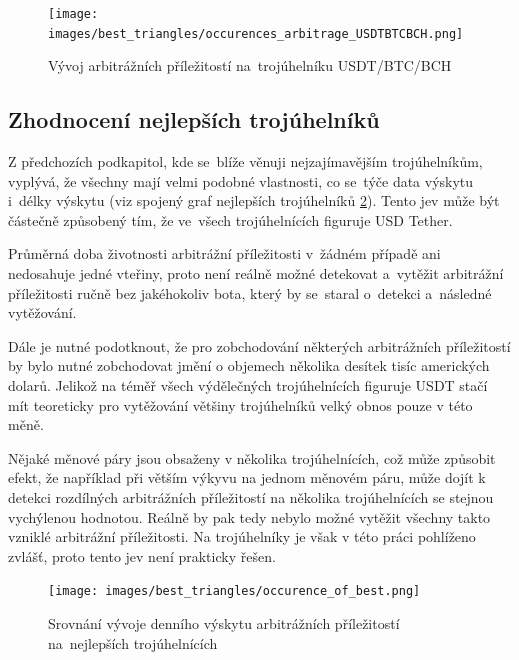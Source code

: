 \documentclass[thesis=B,czech]{FITthesis}[2019/03/21]
\begin{document}
\begin{figure}\centering
	\texttt{[image: images/best\_triangles/occurences\_arbitrage\_USDTBTCBCH.png]}
	\caption{Vývoj arbitrážních příležitostí na~trojúhelníku USDT/BTC/BCH }\label{occurences_arbitrage_USDTBTCBCH}
\end{figure}

\newpage

\subsection{Zhodnocení nejlepších trojúhelníků}
Z předchozích podkapitol, kde se~blíže věnuji nejzajímavějším trojúhelníkům, vyplývá, že všechny mají velmi podobné vlastnosti, co se~týče data výskytu i~délky výskytu (viz spojený graf nejlepších trojúhelníků \ref{occurence_of_best}). Tento jev může být částečně způsobený tím, že ve~všech trojúhelnících figuruje USD Tether. 

Průměrná doba životnosti arbitrážní příležitosti v~žádném případě ani nedosahuje jedné vteřiny, proto není reálně možné detekovat a~vytěžit arbitrážní příležitosti ručně bez jakéhokoliv bota, který by se~staral o~detekci a~následné vytěžování. 

Dále je nutné podotknout, že pro zobchodování některých arbitrážních příležitostí by bylo nutné zobchodovat jmění o objemech několika desítek tisíc amerických dolarů. Jelikož na téměř všech výdělečných trojúhelnících figuruje USDT stačí mít teoreticky pro vytěžování většiny trojúhelníků velký obnos pouze v této měně.

Nějaké měnové páry jsou obsaženy v několika trojúhelnících, což může způsobit efekt, že například při větším výkyvu na jednom měnovém páru, může dojít k detekci rozdílných arbitrážních příležitostí na několika trojúhelnících se stejnou vychýlenou hodnotou. Reálně by pak tedy nebylo možné vytěžit všechny takto vzniklé arbitrážní příležitosti. Na trojúhelníky je však v této práci pohlíženo zvlášť, proto tento jev není prakticky řešen.

\begin{figure}\centering
	\texttt{[image: images/best\_triangles/occurence\_of\_best.png]}
	\caption{Srovnání vývoje denního výskytu arbitrážních příležitostí na~nejlepších trojúhelnících }\label{occurence_of_best}
\end{figure}
\end{document}
